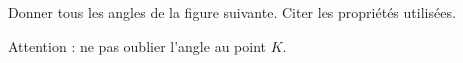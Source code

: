 
\begin{exercice}\label{exo2smath-0160}

    Donner tous les angles de la figure suivante. Citer les propriétés utilisées.
\begin{center}

\end{center}
Attention : ne pas oublier l'angle au point \( K\).

\end{exercice}
